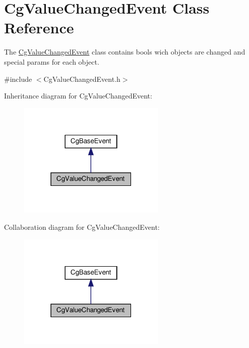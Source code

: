 \hypertarget{class_cg_value_changed_event}{}\section{Cg\+Value\+Changed\+Event Class Reference}
\label{class_cg_value_changed_event}


The \hyperlink{class_cg_value_changed_event}{Cg\+Value\+Changed\+Event} class contains bools wich objects are changed and special params for each object.  




{\ttfamily \#include $<$Cg\+Value\+Changed\+Event.\+h$>$}



Inheritance diagram for Cg\+Value\+Changed\+Event\+:
\nopagebreak
\begin{figure}[H]
\begin{center}
\leavevmode
\includegraphics[width=199pt]{class_cg_value_changed_event__inherit__graph}
\end{center}
\end{figure}


Collaboration diagram for Cg\+Value\+Changed\+Event\+:
\nopagebreak
\begin{figure}[H]
\begin{center}
\leavevmode
\includegraphics[width=199pt]{class_cg_value_changed_event__coll__graph}
\end{center}
\end{figure}
